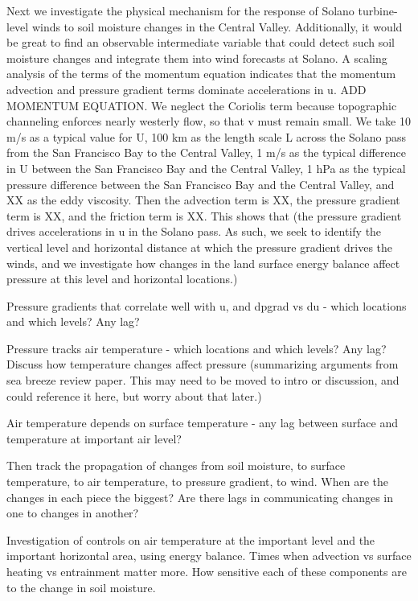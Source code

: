 \documentclass[12pt]{amsart}
\begin{document}
Next we investigate the physical mechanism for the response of Solano turbine-level winds to soil moisture changes in the Central Valley.  Additionally, it would be great to find an observable intermediate variable that could detect such soil moisture changes and integrate them into wind forecasts at Solano.  A scaling analysis of the terms of the momentum equation indicates that the momentum advection and pressure gradient terms dominate accelerations in u.  ADD MOMENTUM EQUATION.  We neglect the Coriolis term because topographic channeling enforces nearly westerly flow, so that v must remain small.  We take 10 m/s as a typical value for U, 100 km as the length scale L across the Solano pass from the San Francisco Bay to the Central Valley, 1 m/s as the typical difference in U between the San Francisco Bay and the Central Valley, 1 hPa as the typical pressure difference between the San Francisco Bay and the Central Valley, and XX as the eddy viscosity. Then the advection term is XX, the pressure gradient term is XX, and the friction term is XX.  This shows that (the pressure gradient drives accelerations in u in the Solano pass.  As such, we seek to identify the vertical level and horizontal distance at which the pressure gradient drives the winds, and we investigate how changes in the land surface energy balance affect pressure at this level and horizontal locations.)

Pressure gradients that correlate well with u, and dpgrad vs du - which locations and which levels?  Any lag?

Pressure tracks air temperature - which locations and which levels?  Any lag?  Discuss how temperature changes affect pressure (summarizing arguments from sea breeze review paper.  This may need to be moved to intro or discussion, and could reference it here, but worry about that later.)

Air temperature depends on surface temperature - any lag between surface and temperature at important air level?

Then track the propagation of changes from soil moisture, to surface temperature, to air temperature, to pressure gradient, to wind.  When are the changes in each piece the biggest?  Are there lags in communicating changes in one to changes in another?

Investigation of controls on air temperature at the important level and the important horizontal area, using energy balance.  Times when advection vs surface heating vs entrainment matter more.  How sensitive each of these components are to the change in soil moisture.
\end{document}
